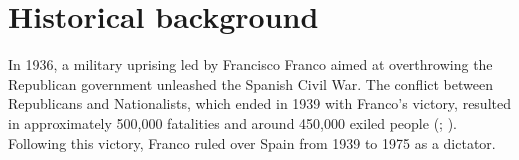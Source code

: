 \documentclass[a4paper,oneside,final,onecolumn,12pt,english]{article}
\begin{document}


\section{Historical background} \label{background}
In 1936, a military uprising led by Francisco Franco aimed at overthrowing the Republican government unleashed the Spanish Civil War. The conflict between Republicans and Nationalists, which ended in 1939 with Franco's victory, resulted in approximately 500,000 fatalities and around 450,000 exiled people (\cite[][]{castro1993}; \cite[][p. 608]{preston2011holocausto}). Following this victory, Franco ruled over Spain from 1939 to 1975 as a dictator.
\end{document}
